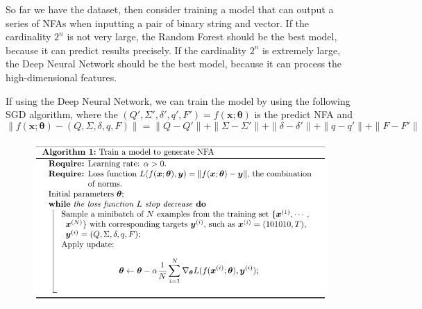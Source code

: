 \documentclass{article}
\begin{document}
So far we have the dataset, then consider training a model that can output a series of NFAs when inputting a pair of binary string and vector. If the cardinality $2^n$ is not very large, the Random Forest\cite{ho1995random} should be the best model, because it can predict results precisely. If the cardinality $2^n$ is extremely large, the Deep Neural Network\cite{goodfellow2016deep} should be the best model, because it can process the high-dimensional features.

If using the Deep Neural Network, we can train the model by using the following SGD algorithm, where the $(Q', \Sigma', \delta', q', F') = f(\boldsymbol{x}; \boldsymbol{\theta})$ is the predict NFA and 
\begin{equation*}
    \| f(\boldsymbol{x}; \boldsymbol{\theta}) - (Q, \Sigma, \delta, q, F) \| = 
    \| Q - Q' \| + \| \Sigma - \Sigma' \| + \| \delta - \delta' \| + \| q - q' \| + \| F - F' \| 
\end{equation*}
\begin{figure}[H]
    \centering
    \includegraphics[width=1.0\linewidth]{src/train_loop.pdf}
    \label{alg: train loop}
\end{figure}
\end{document}
